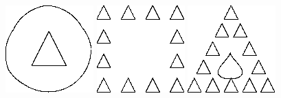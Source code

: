 \begin{figure}
\centering
\includegraphics[width=.3\linewidth]{ext/images/embedd.png}
\quad
\includegraphics[width=.3\linewidth]{ext/images/comp.png}
\quad
\includegraphics[width=.3\linewidth]{ext/images/comp_and_embed.png}

\vspace{1cm}


\end{figure}
